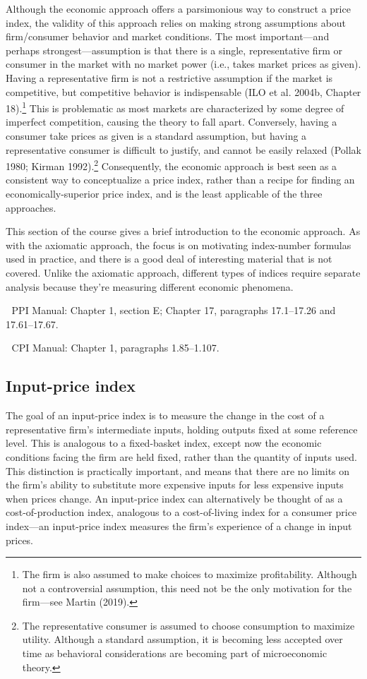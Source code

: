 \documentclass[
]{article}
\begin{document}
Although the economic approach offers a parsimonious way to construct a price index, the validity of this approach relies on making strong assumptions about firm/consumer behavior and market conditions. The most important---and perhaps strongest---assumption is that there is a single, representative firm or consumer in the market with no market power (i.e., takes market prices as given). Having a representative firm is not a restrictive assumption if the market is competitive, but competitive behavior is indispensable (ILO et al. 2004b, Chapter 18).\footnote{The firm is also assumed to make choices to maximize profitability. Although not a controversial assumption, this need not be the only motivation for the firm---see Martin (2019).} This is problematic as most markets are characterized by some degree of imperfect competition, causing the theory to fall apart. Conversely, having a consumer take prices as given is a standard assumption, but having a representative consumer is difficult to justify, and cannot be easily relaxed (Pollak 1980; Kirman 1992).\footnote{The representative consumer is assumed to choose consumption to maximize utility. Although a standard assumption, it is becoming less accepted over time as behavioral considerations are becoming part of microeconomic theory.} Consequently, the economic approach is best seen as a consistent way to conceptualize a price index, rather than a recipe for finding an economically-superior price index, and is the least applicable of the three approaches.

This section of the course gives a brief introduction to the economic approach. As with the axiomatic approach, the focus is on motivating index-number formulas used in practice, and there is a good deal of interesting material that is not covered. Unlike the axiomatic approach, different types of indices require separate analysis because they're measuring different economic phenomena.

📖 PPI Manual: Chapter 1, section E; Chapter 17, paragraphs 17.1--17.26 and 17.61--17.67.

📖 CPI Manual: Chapter 1, paragraphs 1.85--1.107.

\hypertarget{input-price-index}{%
\subsection{Input-price index}\label{input-price-index}}

The goal of an input-price index is to measure the change in the cost of a representative firm's intermediate inputs, holding outputs fixed at some reference level. This is analogous to a fixed-basket index, except now the economic conditions facing the firm are held fixed, rather than the quantity of inputs used. This distinction is practically important, and means that there are no limits on the firm's ability to substitute more expensive inputs for less expensive inputs when prices change. An input-price index can alternatively be thought of as a cost-of-production index, analogous to a cost-of-living index for a consumer price index---an input-price index measures the firm's experience of a change in input prices.
\end{document}

